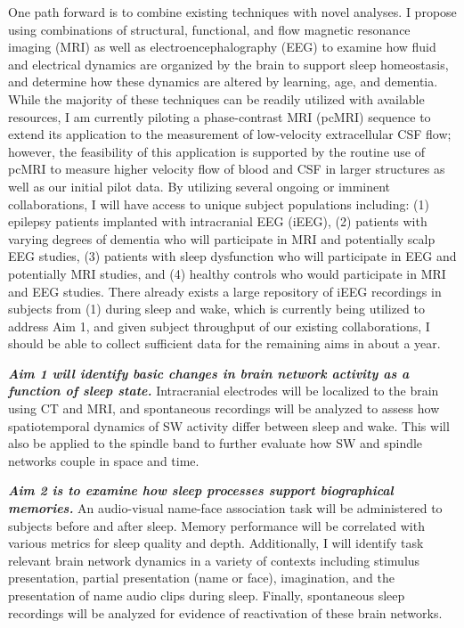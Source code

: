 One path forward is to combine existing techniques with novel analyses. I propose using combinations of structural, functional, and flow magnetic resonance imaging (MRI) as well as electroencephalography (EEG) to examine how fluid and electrical dynamics are organized by the brain to support sleep homeostasis, and determine how these dynamics are altered by learning, age, and dementia. While the majority of these techniques can be readily utilized with available resources, I am currently piloting a phase-contrast MRI (pcMRI) sequence to extend its application to the measurement of low-velocity extracellular CSF flow; however, the feasibility of this application is supported by the routine use of pcMRI to measure higher velocity flow of blood and CSF in larger structures as well as our initial pilot data. By utilizing several ongoing or imminent collaborations, I will have access to unique subject populations including: (1) epilepsy patients implanted with intracranial EEG (iEEG), (2) patients with varying degrees of dementia who will participate in MRI and potentially scalp EEG studies, (3) patients with sleep dysfunction who will participate in EEG and potentially MRI studies, and (4) healthy controls who would participate in MRI and EEG studies. There already exists a large repository of iEEG recordings in subjects from (1) during sleep and wake, which is currently being utilized to address Aim 1, and given subject throughput of our existing collaborations, I should be able to collect sufficient data for the remaining aims in about a year.

\textbf{\textit{Aim 1 will identify basic changes in brain network activity as a function of sleep state.}} Intracranial electrodes will be localized to the brain using CT and MRI, and spontaneous recordings will be analyzed to assess how spatiotemporal dynamics of SW activity differ between sleep and wake. This will also be applied to the spindle band to further evaluate how SW and spindle networks couple in space and time. 

\textbf{\textit{Aim 2 is to examine how sleep processes support biographical memories.}} An audio-visual name-face association task will be administered to subjects before and after sleep. Memory performance will be correlated with various metrics for sleep quality and depth. Additionally, I will identify task relevant brain network dynamics in a variety of contexts including stimulus presentation, partial presentation (name or face), imagination, and the presentation of name audio clips during sleep. Finally, spontaneous sleep recordings will be analyzed for evidence of reactivation of these brain networks.      


